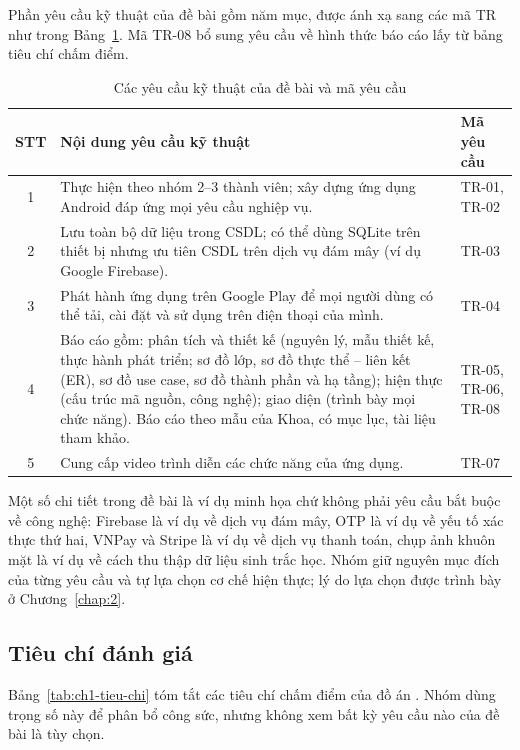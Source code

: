 Phần yêu cầu kỹ thuật của đề bài gồm năm mục, được ánh xạ sang các mã TR như trong Bảng~\ref{tab:ch1-yeu-cau-ky-thuat}. Mã TR-08 bổ sung yêu cầu về hình thức báo cáo lấy từ bảng tiêu chí chấm điểm.

\begin{table}[H]
	\centering
	\caption{Các yêu cầu kỹ thuật của đề bài và mã yêu cầu}
	\label{tab:ch1-yeu-cau-ky-thuat}
	\linespread{1.15}\small
	\begin{tabularx}{\textwidth}{@{}c X p{2.6cm}@{}}
		\toprule
		\textbf{STT} & \textbf{Nội dung yêu cầu kỹ thuật} & \textbf{Mã yêu cầu} \\
		\midrule
		1 & Thực hiện theo nhóm 2--3 thành viên; xây dựng ứng dụng Android đáp ứng mọi yêu cầu nghiệp vụ. & TR-01, TR-02 \\
		\midrule
		2 & Lưu toàn bộ dữ liệu trong CSDL; có thể dùng SQLite trên thiết bị nhưng ưu tiên CSDL trên dịch vụ đám mây (ví dụ Google Firebase). & TR-03 \\
		\midrule
		3 & Phát hành ứng dụng trên Google Play để mọi người dùng có thể tải, cài đặt và sử dụng trên điện thoại của mình. & TR-04 \\
		\midrule
		4 & Báo cáo gồm: phân tích và thiết kế (nguyên lý, mẫu thiết kế, thực hành phát triển; sơ đồ lớp, sơ đồ thực thể -- liên kết (ER), sơ đồ use case, sơ đồ thành phần và hạ tầng); hiện thực (cấu trúc mã nguồn, công nghệ); giao diện (trình bày mọi chức năng). Báo cáo theo mẫu của Khoa, có mục lục, tài liệu tham khảo. & TR-05, TR-06, TR-08 \\
		\midrule
		5 & Cung cấp video trình diễn các chức năng của ứng dụng. & TR-07 \\
		\bottomrule
	\end{tabularx}
\end{table}

Một số chi tiết trong đề bài là ví dụ minh họa chứ không phải yêu cầu bắt buộc về công nghệ: Firebase là ví dụ về dịch vụ đám mây, OTP là ví dụ về yếu tố xác thực thứ hai, VNPay và Stripe là ví dụ về dịch vụ thanh toán, chụp ảnh khuôn mặt là ví dụ về cách thu thập dữ liệu sinh trắc học. Nhóm giữ nguyên mục đích của từng yêu cầu và tự lựa chọn cơ chế hiện thực; lý do lựa chọn được trình bày ở Chương~\ref{chap:2}.

\subsection{Tiêu chí đánh giá}

Bảng~\ref{tab:ch1-tieu-chi} tóm tắt các tiêu chí chấm điểm của đồ án \parencite{ch1-tieuchi}. Nhóm dùng trọng số này để phân bổ công sức, nhưng không xem bất kỳ yêu cầu nào của đề bài là tùy chọn.

